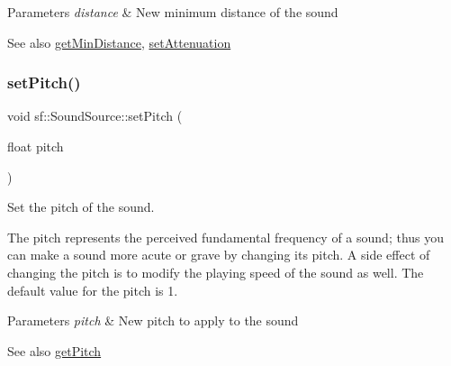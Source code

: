 \begin{DoxyParams}{Parameters}
{\em distance} & New minimum distance of the sound\\
\hline
\end{DoxyParams}
\begin{DoxySeeAlso}{See also}
\mbox{\hyperlink{classsf_1_1_sound_source_a605ca7f359ec1c36fcccdcd4696562ac}{get\+Min\+Distance}}, \mbox{\hyperlink{classsf_1_1_sound_source_aa2adff44cd2f8b4e3c7315d7c2a45626}{set\+Attenuation}} \begin{DoxyVerb}\end{DoxyVerb}
 
\end{DoxySeeAlso}
\mbox{\label{classsf_1_1_sound_source_a72a13695ed48b7f7b55e7cd4431f4bb6}} 
\subsubsection{\texorpdfstring{setPitch()}{setPitch()}}
{\footnotesize\ttfamily void sf\+::\+Sound\+Source\+::set\+Pitch (\begin{DoxyParamCaption}\item[{float}]{pitch }\end{DoxyParamCaption})}



Set the pitch of the sound. 

The pitch represents the perceived fundamental frequency of a sound; thus you can make a sound more acute or grave by changing its pitch. A side effect of changing the pitch is to modify the playing speed of the sound as well. The default value for the pitch is 1.


\begin{DoxyParams}{Parameters}
{\em pitch} & New pitch to apply to the sound\\
\hline
\end{DoxyParams}
\begin{DoxySeeAlso}{See also}
\mbox{\hyperlink{classsf_1_1_sound_source_a4736acc2c802f927544c9ce52a44a9e4}{get\+Pitch}} \begin{DoxyVerb}\end{DoxyVerb}
 
\end{DoxySeeAlso}
\mbox{\label{classsf_1_1_sound_source_a0480257ea25d986eba6cc3c1a6f8d7c2}} 

